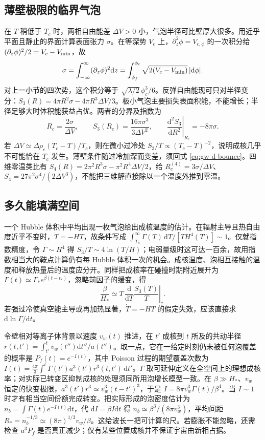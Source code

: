 \subsection{薄壁极限的临界气泡}

在 $T$ 稍低于 $T_c$ 时，两相自由能差 $\Delta V>0$ 小，气泡半径可比壁厚大很多。用近乎平面且静止的界面计算表面张力 $\sigma$。在等深势 $V_c$ 上，$\partial_z^2\phi=V_{c,\phi}$ 的一次积分给 $(\partial_z\phi)^2/2=V_c-V_{\rm min}$，故
\[
 \sigma=\int_{-\infty}^\infty(\partial_z\phi)^2\mathrm dz
 =\int_{\phi_f}^{\phi_t}\sqrt{2(V_c-V_{\rm min})}\,|\mathrm d\phi|.
\]
对上一小节的四次势，这个积分等于 $\sqrt{\lambda/2}\,\phi_c^3/6$。反弹自由能现可只对半径变分：$S_3(R)=4\pi R^2\sigma-4\pi R^3\Delta V/3$。极小气泡主要损失表面积能，不能增长；半径足够大时体积能获益占优。两者的分界及指数为
\[
 R_c=\frac{2\sigma}{\Delta V},\qquad
 S_3(R_c)=\frac{16\pi\sigma^3}{3\Delta V^2},\qquad
 \left.\frac{\mathrm d^2S_3}{\mathrm dR^2}\right|_{R_c}=-8\pi\sigma .
\]
若 $\Delta V\simeq\Delta\rho_c(T_c-T)/T_c$，则在微小过冷处 $S_3/T\propto(T_c-T)^{-2}$，说明成核几乎不可能恰在 $T_c$ 发生。薄壁条件随过冷加深而变差，须回式 \eqref{eq:gw-d-bounce}。四维零温类比有 $S_4(R)=2\pi^2R^3\sigma-\pi^2R^4\Delta V/2$，给 $R_c^{(4)}=3\sigma/\Delta V$、$S_4=27\pi^2\sigma^4/(2\Delta V^3)$，不能把三维解直接除以一个温度外推到零温。

\subsection{多久能填满空间}

一个 Hubble 体积中平均出现一枚气泡给出成核温度的估计。在辐射主导且热自由度近乎不变时，$\dot T=-HT$，故条件写成 $\int_{T_n}^{\infty}\Gamma(T)\,\mathrm dT/[T H^4(T)]\sim1$。仅就指数精度，令 $\Gamma\sim H^4$ 得 $S_3/T\sim4\ln(T/H)$；电弱量级时这可达一百余，故用指数相当大的鞍点计算仍有每 Hubble 体积一次的机会。成核温度、泡相互接触的温度和释放热量后的温度应分开。同样把成核率在碰撞时期附近展开为 $\Gamma(t)\simeq\Gamma_*e^{\beta(t-t_*)}$，忽略前因子的缓变，得
\begin{equation}\label{eq:gw-d-beta}
 \frac{\beta}{H_*}\simeq
 \left.T\,\frac{\mathrm d}{\mathrm dT}\frac{S_3(T)}{T}\right|_* .
\end{equation}
若强过冷使真空能主导或再加热显著，$\dot T=-HT$ 的假定失效，应该直接求 $\mathrm d\ln\Gamma/\mathrm dt$。

令壁相对等离子体背景以速度 $v_w(t)$ 推进，在 $t'$ 成核到 $t$ 所及的共动半径 $r(t,t')=\int_{t'}^t v_w(t'')\mathrm dt''/a(t'')$。取一点，它在一给定时刻仍未被任何泡覆盖的概率是 $P_f(t)=e^{-I(t)}$，其中 Poisson 过程的期望覆盖次数为 $I(t)=\frac{4\pi}{3}\int^t\Gamma(t')a^3(t')r^3(t,t')\,\mathrm dt'$。$\Gamma$ 取可延伸定义在全空间上的理想成核率；对实际已转变区抑制成核的处理须同所用泡增长模型一致。在 $\beta\gg H_*$、$v_w$ 恒定的快变极限，$a^3(t')r^3\simeq v_w^3(t-t')^3$，于是 $I=8\pi v_w^3\Gamma(t)/\beta^4$。当 $I\sim1$ 时才有相当空间份额完成转变。把实际形成的泡密度估计为 $n_b=\int\Gamma(t)e^{-I(t)}\mathrm dt$，代 $\mathrm dI=\beta I\mathrm dt$ 得 $n_b\simeq\beta^3/(8\pi v_w^3)$，平均间距 $R_*=n_b^{-1/3}\simeq(8\pi)^{1/3}v_w/\beta$。这给波长一把可计算的尺。若膨胀不能忽略，还需检查 $a^3P_f$ 是否真正减少；仅有某些位置成核并不保证宇宙由新相占据。

